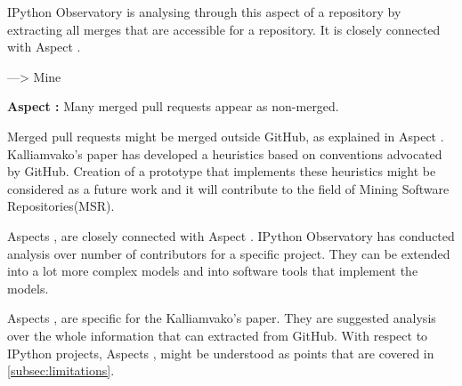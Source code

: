 IPython Observatory is analysing through this aspect of a repository by extracting all merges that are accessible for a repository. It is closely connected with Aspect .

---> Mine

\vspace{5mm}
\begin{mdframed}
\vspace{1px}
\textbf{Aspect :}  Many merged pull requests appear as non-merged.
\vspace{1px}
\end{mdframed}
\vspace{2mm}

Merged pull requests might be merged outside GitHub, as explained in Aspect . Kalliamvako's paper\cite{kalliamvakoupromises} has developed a heuristics based on conventions advocated by GitHub. Creation of a prototype that implements these heuristics might be considered as a future work and it will contribute to the field of Mining Software Repositories(MSR)\cite{MSR2016}.

\vspace{8mm}

Aspects ,  are closely connected with Aspect . IPython Observatory has conducted analysis over number of contributors for a specific project. They can be extended into a lot more complex models and into software tools that implement the models. 

Aspects ,  are specific for the Kalliamvako's paper\cite{kalliamvakoupromises}. They are suggested analysis over the whole information that can extracted from GitHub. With respect to IPython projects, Aspects ,  might be understood as points that are covered in \ref{subsec:limitations}.




